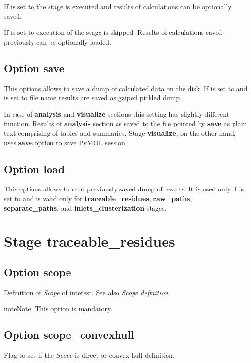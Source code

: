\documentclass[a4paper,10pt,english]{sphinxmanual}
\begin{document}
If  is set to  the stage is executed and results of calculations can be optionally saved.

If  is set to  execution of the stage is skipped. Results of calculations saved previously can be optionally loaded.


\subsection{Option \textbf{save}}
\label{valve/valve_config:option-save}
This options allows to save a dump of calculated data on the disk. If  is set to  and  is set to file name results are saved as gziped pickled dump.

In case of \textbf{analysis} and \textbf{visualize} sections this setting has slightly different function. Results of \textbf{analysis} section as saved to the file pointed by \textbf{save} as plain text comprising of tables and summaries. Stage \textbf{visualize}, on the other hand, uses \textbf{save} option to save PyMOL session.


\subsection{Option \textbf{load}}
\label{valve/valve_config:option-load}
This options allows to read previously saved dump of results. It is used only if  is set to  and is valid only for \textbf{traceable\_residues}, \textbf{raw\_paths}, \textbf{separate\_paths}, and \textbf{inlets\_clusterization} stages.


\section{Stage \textbf{traceable\_residues}}
\label{valve/valve_config:stage-traceable-residues}

\subsection{Option \textbf{scope}}
\label{valve/valve_config:option-scope}
Definition of \emph{Scope} of interest. See also {\hyperref[valve/valve_manual:scope-definition]{\emph{Scope definition}}}.

\begin{notice}{note}{Note:}
This option is mandatory.
\end{notice}


\subsection{Option \textbf{scope\_convexhull}}
\label{valve/valve_config:option-scope-convexhull}
Flag to set if the \emph{Scope} is direct or convex hull definition.
\end{document}
